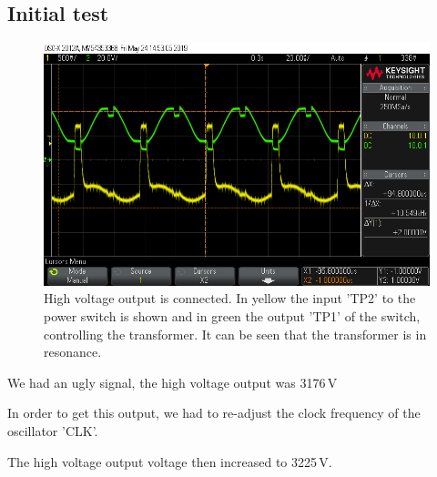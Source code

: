 \subsection{Initial test}


\begin{figure}[H]
\centering
\includegraphics[width=.9\textwidth]{figures/scope_20.png}
\caption{High voltage output is connected. In yellow the input 'TP2' to the power switch is shown and in green the output 'TP1' of the switch, controlling the transformer. It can be seen that the transformer is in resonance.}
\label{fig:scope_20}
\end{figure}


We had an ugly signal, the high voltage output was 3176\,V


In order to get this output, we had to re-adjust the clock frequency of the oscillator 'CLK'.


The high voltage output voltage then increased to 3225\,V.

